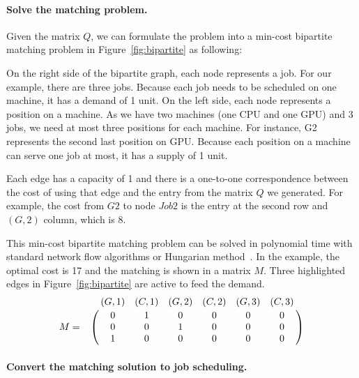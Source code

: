 

\paragraph{Solve the matching problem.}
Given the matrix $Q$, we can formulate the problem into a min-cost bipartite matching problem in Figure~\ref{fig:bipartite} as following: %

On the right side of the bipartite graph, each node represents a job. For our example, there are three jobs. Because each job needs to be scheduled on one machine, it has a demand of 1 unit. On the left side, each node represents a position on a machine. As we have two machines (one CPU and one GPU) and 3 jobs, we need at most three positions for each machine. For instance, G2 represents the second last position on GPU. Because each position on a machine can serve one job at most, it has a supply of 1 unit. 

Each edge has a capacity of 1 and there is a one-to-one correspondence between the cost of using that edge and the entry from the matrix $Q$ we generated. For example, the cost from $G2$ to node $Job2$ is the entry at the second row and $(G,2)$ column, which is 8.

This min-cost bipartite matching problem can be solved in polynomial time with standard network flow algorithms or Hungarian method~\cite{orlin1993faster, kuhn1955hungarian}. In the example, the optimal cost is 17 and the matching is shown in a matrix $M$. Three highlighted edges in Figure~\ref{fig:bipartite} are active to feed the demand. 
$$M = \bordermatrix{
~ &(G,1) & (C,1) & (G,2) & (C,2) & (G,3) & (C,3) \cr
~& 0 & 1 & 0 & 0 & 0 & 0 \cr
~& 0 & 0 & 1 & 0 & 0 & 0 \cr
~& 1 & 0 & 0 & 0 & 0 & 0 \cr
}$$
\paragraph{Convert the matching solution to job scheduling.}

